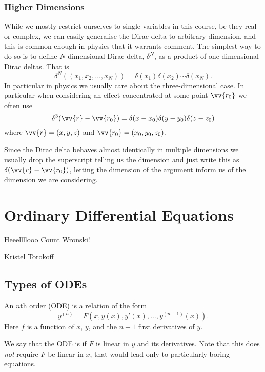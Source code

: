 \documentclass[fleqn]{NotesClass}
\begin{document}
    \subsection{Higher Dimensions}
    While we mostly restrict ourselves to single variables in this course, be they real or complex, we can easily generalise the Dirac delta to arbitrary dimension, and this is common enough in physics that it warrants comment.
    The simplest way to do so is to define \(N\)-dimensional Dirac delta, \(\delta^{N}\), as a product of one-dimensional Dirac deltas.
    That is
    \begin{equation}
        \delta^N((x_1, x_2, \dotsc, x_N)) = \delta(x_1)\delta(x_2)\dotsm \delta(x_N).
    \end{equation}
    In particular in physics we usually care about the three-dimensional case.
    In particular when considering an effect concentrated at some point \(\vv{r_0}\) we often use
    \begin{equation}
        \delta^3(\vv{r} - \vv{r_0}) = \delta(x - x_0)\delta(y - y_0)\delta(z - z_0)
    \end{equation}
    where \(\vv{r} = (x, y, z)\) and \(\vv{r_0} = (x_0, y_0, z_0)\).
    
    Since the Dirac delta behaves almost identically in multiple dimensions we usually drop the superscript telling us the dimension and just write this as \(\delta(\vv{r} - \vv{r_0})\), letting the dimension of the argument inform us of the dimension we are considering.
    
    \chapter{Ordinary Differential Equations}
    \epigraph{Heeellllooo Count Wronski!}{Kristel Torokoff}
    \section{Types of ODEs}
    An \(n\)th order  (ODE) is a relation of the form
    \begin{equation}
        y^{(n)} = F(x, y(x), y'(x), \dotsc, y^{(n-1)}(x)).
    \end{equation}
    Here \(f\) is a function of \(x\), \(y\), and the \(n - 1\) first derivatives of \(y\).
    
    We say that the ODE is  if \(F\) is linear in \(y\) and its derivatives.
    Note that this does \emph{not} require \(F\) be linear in \(x\), that would lead only to particularly boring equations.
    
\end{document}
